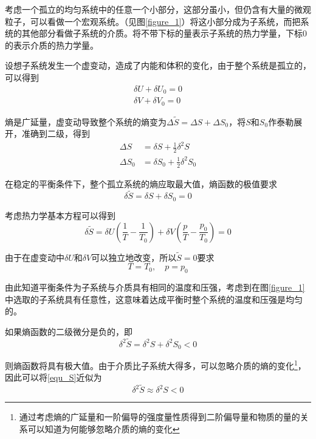 \documentclass[UTF8]{ctexart}
\begin{document}
	考虑一个孤立的均匀系统中的任意一个小部分，这部分虽小，但仍含有大量的微观粒子，可以看做一个宏观系统。（见图\ref{figure_1}）将这小部分成为子系统，而把系统的其他部分看做子系统的介质。将不带下标的量表示子系统的热力学量，下标0的表示介质的热力学量。


	设想子系统发生一个虚变动，造成了内能和体积的变化，由于整个系统是孤立的，可以得到
	\begin{equation}
	\begin{array}{l}{\delta U+\delta U_{0}=0} \\ {\delta V+\delta V_{0}=0}\end{array}
	\end{equation}
	
\noindent 熵是广延量，虚变动导致整个系统的熵变为$ \Delta \tilde{S} = \Delta S + \Delta S_{0} $，将$ S $和$ S_{0} $作泰勒展开，准确到二级，得到
\begin{equation}
\begin{aligned} \Delta S &=\delta S+\frac{1}{2} \delta^{2} S \\ \Delta S_{0} &=\delta S_{0}+\frac{1}{2} \delta^{2} S_{0} \end{aligned}
\end{equation}

\noindent 在稳定的平衡条件下，整个孤立系统的熵应取最大值，熵函数的极值要求
\begin{equation}
\delta \tilde{S}=\delta S+\delta S_{0}=0
\end{equation}

\noindent 考虑热力学基本方程可以得到
\begin{equation}
\delta \tilde{S}=\delta U\left(\frac{1}{T}-\frac{1}{T_{0}}\right)+\delta V\left(\frac{p}{T}-\frac{p_{0}}{T_{0}}\right)=0
\end{equation}

\noindent 由于在虚变动中$ \delta U $和$ \delta V $可以独立地改变，所以$ \tilde{S} = 0 $要求
\begin{equation}
T=T_{0}, \quad p=p_{0}
\end{equation}

\noindent 由此知道平衡条件为子系统与介质具有相同的温度和压强，考虑到在图\ref{figure_1}中选取的子系统具有任意性，这意味着达成平衡时整个系统的温度和压强是均匀的。


	如果熵函数的二级微分是负的，即
	\begin{equation}
	\delta^{2} \tilde{S}=\delta^{2} S+\delta^{2} S_{0}<0\label{equ_S}
	\end{equation}
	
\noindent 则熵函数将具有极大值。由于介质比子系统大得多，可以忽略介质的熵的变化\footnote{通过考虑熵的广延量和一阶偏导的强度量性质得到二阶偏导量和物质的量的关系可以知道为何能够忽略介质的熵的变化}，因此可以将\ref{equ_S}近似为
\begin{equation}
\delta^{2} \tilde{S} \approx \delta^{2} S<0
\end{equation}
\end{document}
